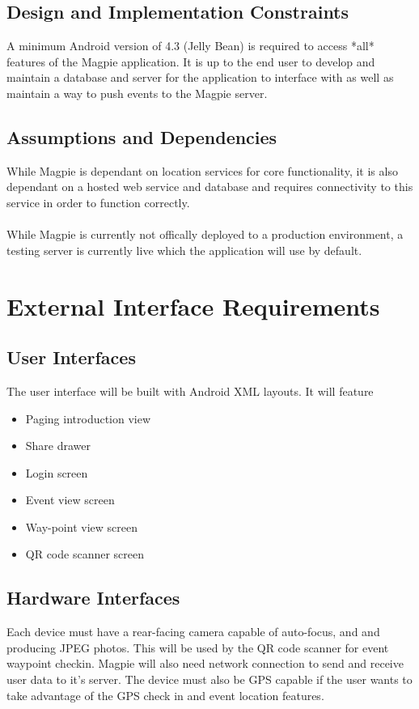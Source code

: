 \documentclass{scrreprt}
\begin{document}
\section{Design and Implementation Constraints}
A minimum Android version of 4.3 (Jelly Bean) is required to access *all* features of the Magpie application.
It is up to the end user to develop and maintain a database and server for the application to interface with
as well as maintain a way to push events to the Magpie server.

\section{Assumptions and Dependencies}
While Magpie is dependant on location services for core functionality,
it is also dependant on a hosted web service and database and requires connectivity to
this service in order to function correctly. \\ \\
While Magpie is currently not offically deployed to a production environment, a testing server is
currently live which the application will use by default.

\chapter{External Interface Requirements}

\section{User Interfaces}

The user interface will be built with Android XML layouts. It will feature
\begin{itemize}
\item Paging introduction view
\item Share drawer
\item Login screen
\item Event view screen
\item Way-point view screen
\item QR code scanner screen
\end{itemize}

\section{Hardware Interfaces}
Each device must have a rear-facing camera capable of auto-focus,
and and producing JPEG photos. This will be used by the QR code scanner for event waypoint checkin.
Magpie will also need network connection to send and receive user data to it's server.
The device must also be GPS capable if the user wants to take advantage of the GPS check in and event location features.
\end{document}

